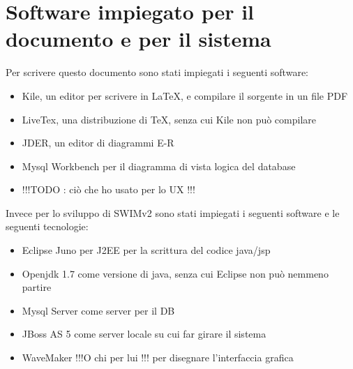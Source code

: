 \pagebreak

\section{Software impiegato per il documento e per il sistema}
Per scrivere questo documento sono stati impiegati i seguenti software:
\begin{itemize}
 \item Kile, un editor per scrivere in \LaTeX, e compilare il sorgente in un file PDF
 \item LiveTex, una distribuzione di \TeX , senza cui Kile non può compilare
 \item JDER, un editor di diagrammi E-R
 \item Mysql Workbench per il diagramma di vista logica del database
 \item !!!TODO : ciò che ho usato per lo UX !!!
\end{itemize}
Invece per lo sviluppo di SWIMv2 sono stati impiegati i seguenti software e le seguenti tecnologie:
\begin{itemize}
 \item Eclipse Juno per J2EE per la scrittura del codice java/jsp
 \item Openjdk 1.7 come versione di java, senza cui Eclipse non può nemmeno partire
 \item Mysql Server come server per il DB
 \item JBoss AS 5 come server locale su cui far girare il sistema
 \item WaveMaker !!!O chi per lui !!! per disegnare l'interfaccia grafica
\end{itemize}

